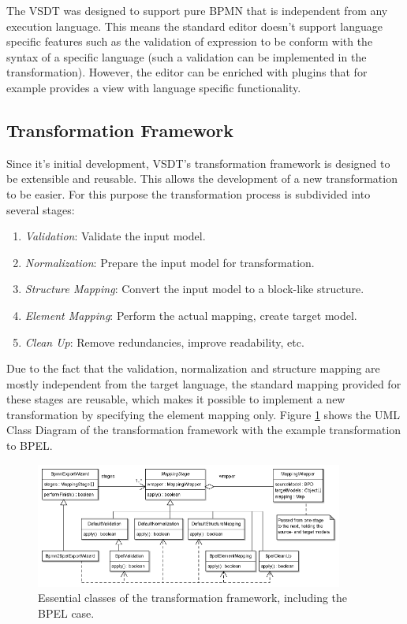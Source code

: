 The VSDT was designed to support pure BPMN that is independent from any execution language\cite{TKAH08}. This means the standard editor doesn't support language specific features such as the validation of expression to be conform with the syntax of a specific language (such a validation can be implemented in the transformation). However, the editor can be enriched with plugins that for example provides a view with language specific functionality.  


\subsection{Transformation Framework}
Since it's initial development, VSDT's transformation framework is designed to be extensible and reusable. This allows the development of a new transformation to be easier. For this purpose the transformation process is subdivided into several stages: 
\begin{enumerate}
	\item \textit{Validation}: Validate the input model.
	\item \textit{Normalization}: Prepare the input model for transformation.
	\item \textit{Structure Mapping}: Convert the input model to a block-like structure.
	\item \textit{Element Mapping}: Perform the actual mapping, create target model.
	\item \textit{Clean Up}: Remove redundancies, improve readability, etc.
\end{enumerate}

Due to the fact that the validation, normalization and structure mapping are mostly independent from the target language, the standard mapping provided for these stages are reusable, which makes it possible to implement a new transformation by specifying the element mapping only. Figure \ref{fig:transform} shows the UML Class Diagram of the transformation framework with the example transformation to BPEL.
\begin{figure}[h]
	\centering
		\includegraphics[width=0.90\textwidth]{images/transformation.png}
	\caption{Essential classes of the transformation framework, including the BPEL case.\cite{TK07}}
	\label{fig:transform}
\end{figure}

